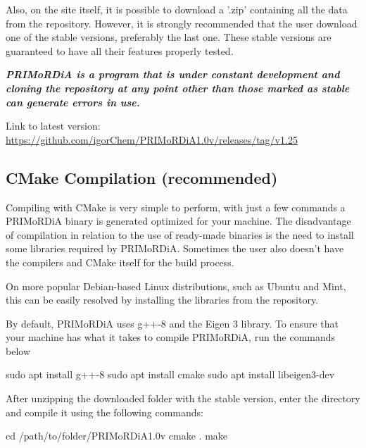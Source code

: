 \documentclass[a4paper,11pt]{refart}
\begin{document}
	Also, on the site itself, it is possible to download a '.zip' containing all the data from the repository.
	However, it is strongly recommended that the user download one of the stable versions, preferably the last one. These stable versions are guaranteed to have all their features properly tested.

	\emph{\textbf{PRIMoRDiA is a program that is under constant development and cloning the repository at any point other than those marked as stable can generate errors in use. }}

	Link to latest version: \url{https://github.com/igorChem/PRIMoRDiA1.0v/releases/tag/v1.25}

	\subsection{CMake Compilation (recommended) }

	Compiling with CMake is very simple to perform, with just a few commands a PRIMoRDiA binary is generated optimized for your machine. The disadvantage of compilation in relation to the use of ready-made binaries is the need to install some libraries required by PRIMoRDiA. Sometimes the user also doesn't have the compilers and CMake itself for the build process.

	On more popular Debian-based Linux distributions, such as Ubuntu and Mint, this can be easily resolved by installing the libraries from the repository.

	By default, PRIMoRDiA uses g++-8 and the Eigen 3 library. To ensure that your machine has what it takes to compile PRIMoRDiA, run the commands below

	\hspace*{-\leftmarginwidth}
	\begin{minipage}{\fullwidth}
		\begin{commandshell}
			sudo apt install g++-8 
			sudo apt install cmake
			sudo apt install libeigen3-dev
		\end{commandshell}
	\end{minipage}

	After unzipping the downloaded folder with the stable version, enter the directory and compile it using the following commands:

	\hspace*{-\leftmarginwidth}
	\begin{minipage}{\fullwidth}
		\begin{commandshell}cd /path/to/folder/PRIMoRDiA1.0v
			cmake .
			make
		\end{commandshell}
	\end{minipage}
\end{document}
